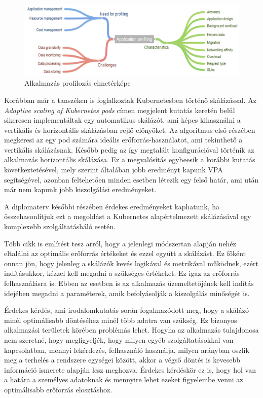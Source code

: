 \begin{figure}[!ht]
\centering
\includegraphics[width=150mm, keepaspectratio]{figures/applicationprofiling.png}
\caption{Alkalmazás profilozás elmetérképe\citep{CloudResourceManagement}}
\label{fig:applicationprofiling}
\end{figure}

Korábban már a tanszéken is foglalkoztak Kubernetesben történő skálázással. Az \emph{Adaptive scaling of Kubernetes pods}\cite{AdaptiveScalingOfPods} címen megjelent kutatás keretén belül sikeresen implementáltak egy automatikus skálázót, ami képes kihasználni a vertikális és horizontális skálázásban rejlő előnyöket. Az algoritmus első részében megkeresi az egy pod számára ideális erőforrás-használatot, ami tekinthető a vertikális skálázásnak. Később pedig az így megtalált konfigurációval történik az alkalmazás horizontális skálázása. Ez a megvalósítás egybeesik a korábbi kutatás következtetésével\citep{bscThesis}, mely szerint általában jobb eredményt kapunk VPA segítségével, azonban feltehetően minden esetben létezik egy felső határ, ami után már nem kapunk jobb kiszolgálási eredményeket. 

A diplomaterv későbbi részében érdekes eredményeket kaphatunk, ha összehasonlítjuk ezt a megoldást a Kubernetes alapértelmezett skálázásával egy komplexebb szolgáltatásháló esetén.

Több cikk\cite{AdaptiveScalingOfPods}\citep{PredictingUsageAndProactiveScaling} is említést tesz arról, hogy a jelenlegi módszertan alapján nehéz eltalálni az optimális erőforrás értékeket és ezzel együtt a skálázást. Ez főként onnan jön, hogy jelenleg a skálázók kevés logikával és metrikával működnek, ezért indításukkor, kézzel kell megadni a szükséges értékeket. Ez igaz az erőforrás felhasználásra is. Ebben az esetben is az alkalmazás üzemeltetőjének kell indítás idejében megadni a paraméterek, amik befolyásolják a kiszolgálás minőségét is. 

Érdekes kérdés, ami irodalomkutatás során fogalmazódott meg, hogy a skálázó minél optimálisabb döntéséhez minél több adatra van szükség. Ez bizonyos alkalmazási területek körében problémás lehet. Hogyha az alkalmazás tulajdonosa nem szeretné, hogy megfigyeljék, hogy milyen egyéb szolgáltatásokkal van kapcsolatban, mennyi lekérdezés, felhasználó használja, milyen arányban oszlik meg a terhelés a rendszere egységei között, akkor a végső döntés is kevesebb információ ismerete alapján lesz meghozva. Érdekes kérdéskör ez is, hogy hol van a határa a személyes adatoknak és mennyire lehet ezeket figyelembe venni az optimálisabb erőforrás elosztáshoz.

